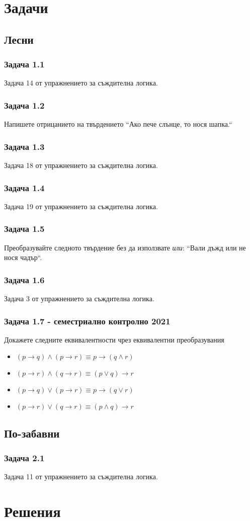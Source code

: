 \documentclass[12pt]{article}
\begin{document}
\section*{Задачи}

\subsection*{Лесни}
\subsubsection*{Задача 1.1}
Задача 14 от упражнението за съждителна логика.
\subsubsection*{Задача 1.2}
Напишете отрицанието на твърдението ``Ако пече слънце, то нося шапка.``
\subsubsection*{Задача 1.3}
Задача 18 от упражнението за съждителна логика.
\subsubsection*{Задача 1.4}
Задача 19 от упражнението за съждителна логика.
\subsubsection*{Задача 1.5}
Преобразувайте следното твърдение без да използвате \emph{или}: ``Вали дъжд или не нося чадър``.
\subsubsection*{Задача 1.6}
Задача 3 от упражнението за съждителна логика.
\subsubsection*{Задача 1.7 - семестриално контролно 2021}
Докажете следните еквивалентности чрез еквивалентни преобразувания
\begin{itemize}
    \item $(p \rightarrow q) \land (p \rightarrow r) \equiv p \rightarrow (q \land r)$
    \item $(p \rightarrow r) \land (q \rightarrow r) \equiv (p \lor q) \rightarrow r$
    \item $(p \rightarrow q) \lor (p \rightarrow r) \equiv p \rightarrow (q \lor r)$
    \item $(p \rightarrow r) \lor (q \rightarrow r) \equiv (p \land q) \rightarrow r$
\end{itemize}

\subsection*{По-забавни}
\subsubsection*{Задача 2.1}
Задача 11 от упражнението за съждителна логика.

\section*{Решения}
\end{document}
